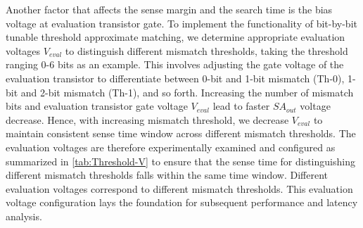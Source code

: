 Another factor that affects the sense margin and the search time is the bias voltage at evaluation transistor gate. 
To implement the functionality of bit-by-bit tunable threshold approximate matching, we determine appropriate evaluation voltages $\textit{V}_\textit{eval}$ to distinguish different mismatch thresholds, taking the threshold ranging 0-6 bits as an example.
This involves adjusting the gate voltage of the evaluation transistor to differentiate between 0-bit and 1-bit mismatch (Th-0), 1-bit and 2-bit mismatch (Th-1), and so forth. 
Increasing the number of mismatch bits and evaluation transistor gate voltage $\textit{V}_\textit{eval}$ lead to faster $\textit{SA}_\textit{out}$ voltage decrease. 
Hence, with increasing mismatch threshold, we decrease $\textit{V}_\textit{eval}$ to maintain consistent sense time window across different mismatch thresholds.
The evaluation voltages are therefore experimentally examined and configured as summarized in \autoref{tab:Threshold-V} to ensure that the sense time for distinguishing different mismatch thresholds falls within the same time window.
Different evaluation voltages correspond to different mismatch thresholds. 
This evaluation voltage configuration lays the foundation for subsequent performance and latency analysis.

